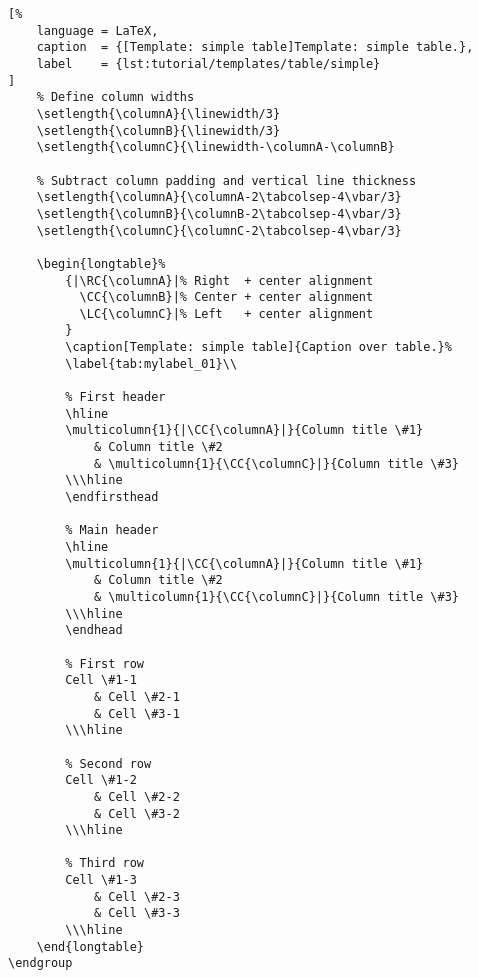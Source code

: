 \begin{lstlisting}[%
    language = LaTeX,
    caption  = {[Template: simple table]Template: simple table.},
    label    = {lst:tutorial/templates/table/simple}
]
    % Define column widths
    \setlength{\columnA}{\linewidth/3}
    \setlength{\columnB}{\linewidth/3}
    \setlength{\columnC}{\linewidth-\columnA-\columnB}
    
    % Subtract column padding and vertical line thickness
    \setlength{\columnA}{\columnA-2\tabcolsep-4\vbar/3}
    \setlength{\columnB}{\columnB-2\tabcolsep-4\vbar/3}
    \setlength{\columnC}{\columnC-2\tabcolsep-4\vbar/3}
    
    \begin{longtable}%
        {|\RC{\columnA}|% Right  + center alignment
          \CC{\columnB}|% Center + center alignment
          \LC{\columnC}|% Left   + center alignment
        }
        \caption[Template: simple table]{Caption over table.}%
        \label{tab:mylabel_01}\\
        
        % First header
        \hline
        \multicolumn{1}{|\CC{\columnA}|}{Column title \#1}
            & Column title \#2
            & \multicolumn{1}{\CC{\columnC}|}{Column title \#3}
        \\\hline
        \endfirsthead
        
        % Main header
        \hline
        \multicolumn{1}{|\CC{\columnA}|}{Column title \#1}
            & Column title \#2
            & \multicolumn{1}{\CC{\columnC}|}{Column title \#3}
        \\\hline
        \endhead
        
        % First row
        Cell \#1-1
            & Cell \#2-1
            & Cell \#3-1
        \\\hline
        
        % Second row
        Cell \#1-2
            & Cell \#2-2
            & Cell \#3-2
        \\\hline
        
        % Third row
        Cell \#1-3
            & Cell \#2-3
            & Cell \#3-3
        \\\hline
    \end{longtable}
\endgroup
\end{lstlisting}


